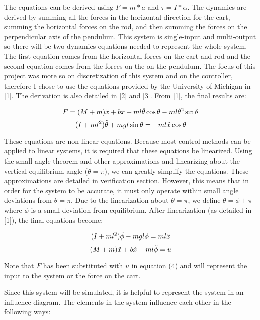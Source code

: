 \documentclass{article}
\begin{document}
The equations can be derived using $F=m*a$ and $\tau = I* \alpha$. The dynamics are derived by summing all the forces in the horizontal direction for the cart, summing the horizontal forces on the rod, and then summing the forces on the perpendicular axis of the pendulum. This system is single-input and multi-output so there will be two dynamics equations needed to represent the whole system. The first equation comes from the horizontal forces on the cart and rod and the second equation comes from the forces on the on the pendulum. The focus of this project was more so on discretization of this system and on the controller, therefore I chose to use the equations provided by the University of Michigan in [1]. The derivation is also detailed in [2] and [3]. From [1], the final results are: 

\begin{equation}
    F = (M + m)\Ddot{x} + b\Dot{x} + ml\Ddot{\theta}\cos{\theta} - ml\Dot{\theta}^2\sin{\theta}
\end{equation}
\begin{equation}
    (I + ml^2)\Ddot{\theta} + mgl\sin{\theta} = -ml\Ddot{x}\cos{\theta}
\end{equation}

These equations are non-linear equations. Because most control methods can be applied to linear systems, it is required that these equations be linearized. Using the small angle theorem and other approximations and linearizing about the vertical equilibrium angle ($\theta = \pi$), we can greatly simplify the equations. These approximations are detailed in verification section. However, this means that in order for the system to be accurate, it must only operate within small angle deviations from $\theta = \pi$. Due to the linearization about  $\theta = \pi$, we define $\theta = \phi + \pi$ where $\phi$ is a small deviation from equilibrium.  After linearization (as detailed in [1]), the final equations become: 

\begin{equation}
    (I+ml^2)\Ddot{\phi} -  mgl\phi = ml\Ddot{x}
\end{equation}
\begin{equation}
    (M+m)\Ddot{x} + b\Dot{x} - ml\Ddot{\phi} = u
\end{equation}

Note that $F$ has been substituted with $u$ in equation (4) and will represent the input to the system or the force on the cart.

Since this system will be simulated, it is helpful to represent the system in an influence diagram. The elements in the system influence each other in the following ways:
\end{document}
